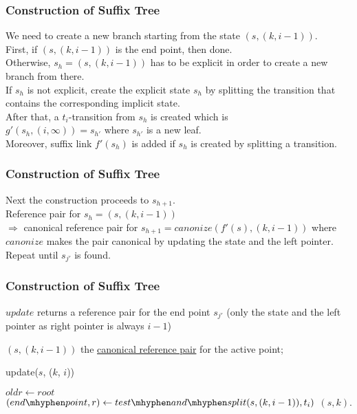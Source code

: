 \documentclass[compress,usenames,dvipsnames]{beamer}
\let\oldnl\nl%
\newcommand{\nonl}{\renewcommand{\nl}{\let\nl\oldnl}}%
\begin{document}
\begin{frame}\frametitle{Construction of Suffix Tree}
    We need to create a new branch starting from the state $(s, (k, i - 1))$. \\
    \hfill \break
    First, if $(s, (k, i - 1))$ is the end point, then done. \\
    Otherwise, $s_h = (s, (k, i - 1))$ has to be explicit in order to create a new branch from there. \\
    \hfill \break
    If $s_h$ is not explicit, create the explicit state $s_h$ by splitting the transition that contains the corresponding implicit state. \\
    After that, a $t_i$-transition from $s_h$ is created which is \\
    $g'(s_h, (i, \infty)) = s_{h'}$ where $s_{h'}$ is a new leaf. \\
    Moreover, suffix link $f'(s_h)$ is added if $s_h$ is created by splitting a transition.
\end{frame}

\begin{frame}\frametitle{Construction of Suffix Tree}
    Next the construction proceeds to $s_{h+1}$. \\
    \hfill \break
    Reference pair for $s_h = (s, (k, i - 1)) $ \\ 
    $\Rightarrow $ canonical reference pair for $s_{h+1} = canonize(f'(s), (k, i-1))$ where $canonize$ makes the pair canonical by updating the state and the left pointer. \\
    \hfill \break
    Repeat until $s_{j'}$ is found.
\end{frame}

\begin{frame}\frametitle{Construction of Suffix Tree}
    $update$ returns a reference pair for the end point $s_{j'}$ (only the state and the left pointer as right pointer is always $i - 1$) \\
    \hfill \break
    \LinesNumbered
    \begin{procedure}[H]
        \SetAlgoNoEnd
        \nonl $(s, (k, i - 1))$ the \underline{canonical reference pair} for the active point;
        \caption{update($s$, ($k$, $i$))}
        $oldr \leftarrow root$\;
        $(end\mhyphen point,r) \leftarrow test \mhyphen and \mhyphen split(s, (k, i - 1)),t_i)$\;
        \Return $(s, k)$.
    \end{procedure}
\end{frame}
\end{document}
